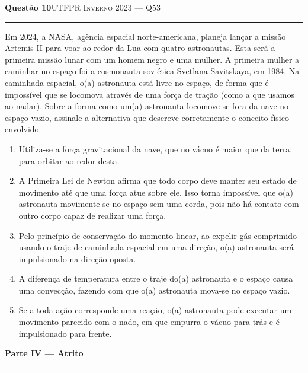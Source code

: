 \documentclass[11pt,a4paper]{article}
\newcommand{\fonte}[1]{{\small\scshape\color{grafite}#1}}
\newenvironment{questao}[2]{%
  \needspace{6\baselineskip}
  \par\addvspace{1.6em}
  {\large\bfseries\color{vinho}Quest\~ao #1}\hfill #2\\[-0.55em]
  {\color{black!25}\rule{\linewidth}{0.4pt}}
  \par\nobreak\smallskip
}{\par\addvspace{0.4em}}
\newcommand{\parte}[1]{%
  \needspace{7\baselineskip}
  \vspace{1.8em}
  {\Large\bfseries #1}\\[-0.55em]
  {\color{black!30}\rule{\linewidth}{0.5pt}}
  \par\nobreak\smallskip
}
\begin{document}
\begin{questao}{10}{\fonte{UTFPR Inverno 2023 --- Q53}}
Em 2024, a NASA, ag\^encia espacial norte-americana, planeja lan\c{c}ar
a miss\~ao Artemis II para voar ao redor da Lua com quatro astronautas.
Esta ser\'a a primeira miss\~ao lunar com um homem negro e uma mulher.
A primeira mulher a caminhar no espa\c{c}o foi a cosmonauta sovi\'etica
Svetlana Savitskaya, em 1984. Na caminhada espacial, o(a) astronauta
est\'a livre no espa\c{c}o, de forma que \'e imposs\'ivel que se
locomova atrav\'es de uma for\c{c}a de tra\c{c}\~ao (como a que usamos
ao nadar). Sobre a forma como um(a) astronauta locomove-se fora da nave
no espa\c{c}o vazio, assinale a alternativa que descreve corretamente o
conceito f\'isico envolvido.
\begin{enumerate}
  \item Utiliza-se a for\c{c}a gravitacional da nave, que no v\'acuo \'e
        maior que da terra, para orbitar ao redor desta.
  \item A Primeira Lei de Newton afirma que todo corpo deve manter seu
        estado de movimento at\'e que uma for\c{c}a atue sobre ele. Isso
        torna imposs\'ivel que o(a) astronauta movimente-se no
        espa\c{c}o sem uma corda, pois n\~ao h\'a contato com outro
        corpo capaz de realizar uma for\c{c}a.
  \item Pelo princ\'ipio de conserva\c{c}\~ao do momento linear, ao
        expelir g\'as comprimido usando o traje de caminhada espacial em
        uma dire\c{c}\~ao, o(a) astronauta ser\'a impulsionado na
        dire\c{c}\~ao oposta.
  \item A diferen\c{c}a de temperatura entre o traje do(a) astronauta e
        o espa\c{c}o causa uma convec\c{c}\~ao, fazendo com que o(a)
        astronauta mova-se no espa\c{c}o vazio.
  \item Se a toda a\c{c}\~ao corresponde uma rea\c{c}\~ao, o(a)
        astronauta pode executar um movimento parecido com o nado, em
        que empurra o v\'acuo para tr\'as e \'e impulsionado para
        frente.
\end{enumerate}
\end{questao}

\parte{Parte IV --- Atrito}
\end{document}
